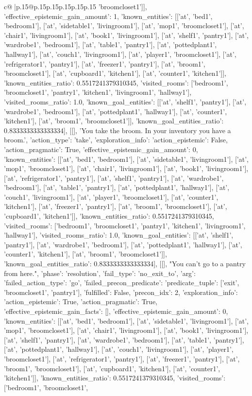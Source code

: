\documentclass{article}
\begin{document}
{\begin{supertabular}{c@{$\;$}|p{.15\linewidth}@{}p{.15\linewidth}p{.15\linewidth}p{.15\linewidth}p{.15\linewidth}p{.15\linewidth}}
{{{'broomcloset1']], 'effective_epistemic_gain_amount': 1, 'known_entities': [['at', 'bed1', 'bedroom1'], ['at', 'sidetable1', 'livingroom1'], ['at', 'mop1', 'broomcloset1'], ['at', 'chair1', 'livingroom1'], ['at', 'book1', 'livingroom1'], ['at', 'shelf1', 'pantry1'], ['at', 'wardrobe1', 'bedroom1'], ['at', 'table1', 'pantry1'], ['at', 'pottedplant1', 'hallway1'], ['at', 'couch1', 'livingroom1'], ['at', 'player1', 'broomcloset1'], ['at', 'refrigerator1', 'pantry1'], ['at', 'freezer1', 'pantry1'], ['at', 'broom1', 'broomcloset1'], ['at', 'cupboard1', 'kitchen1'], ['at', 'counter1', 'kitchen1']], 'known_entities_ratio': 0.5517241379310345, 'visited_rooms': ['bedroom1', 'broomcloset1', 'pantry1', 'kitchen1', 'livingroom1', 'hallway1'], 'visited_rooms_ratio': 1.0, 'known_goal_entities': [['at', 'shelf1', 'pantry1'], ['at', 'wardrobe1', 'bedroom1'], ['at', 'pottedplant1', 'hallway1'], ['at', 'counter1', 'kitchen1'], ['at', 'broom1', 'broomcloset1']], 'known_goal_entities_ratio': 0.8333333333333334}}], [[], 'You take the broom. In your inventory you have a broom.', {'action_type': 'take', 'exploration_info': {'action_epistemic': False, 'action_pragmatic': True, 'effective_epistemic_gain_amount': 0, 'known_entities': [['at', 'bed1', 'bedroom1'], ['at', 'sidetable1', 'livingroom1'], ['at', 'mop1', 'broomcloset1'], ['at', 'chair1', 'livingroom1'], ['at', 'book1', 'livingroom1'], ['at', 'refrigerator1', 'pantry1'], ['at', 'shelf1', 'pantry1'], ['at', 'wardrobe1', 'bedroom1'], ['at', 'table1', 'pantry1'], ['at', 'pottedplant1', 'hallway1'], ['at', 'couch1', 'livingroom1'], ['at', 'player1', 'broomcloset1'], ['at', 'counter1', 'kitchen1'], ['at', 'freezer1', 'pantry1'], ['at', 'broom1', 'broomcloset1'], ['at', 'cupboard1', 'kitchen1']], 'known_entities_ratio': 0.5517241379310345, 'visited_rooms': ['bedroom1', 'broomcloset1', 'pantry1', 'kitchen1', 'livingroom1', 'hallway1'], 'visited_rooms_ratio': 1.0, 'known_goal_entities': [['at', 'shelf1', 'pantry1'], ['at', 'wardrobe1', 'bedroom1'], ['at', 'pottedplant1', 'hallway1'], ['at', 'counter1', 'kitchen1'], ['at', 'broom1', 'broomcloset1']], 'known_goal_entities_ratio': 0.8333333333333334}}], [[], "You can't go to a pantry from here.", {'phase': 'resolution', 'fail_type': 'no_exit_to', 'arg': {'failed_action_type': 'go', 'failed_precon_predicate': {'predicate_tuple': ['exit', 'broomcloset1', 'pantry1'], 'fulfilled': False, 'precon_idx': 2}}, 'exploration_info': {'action_epistemic': True, 'action_pragmatic': True, 'effective_epistemic_gain_facts': [], 'effective_epistemic_gain_amount': 0, 'known_entities': [['at', 'bed1', 'bedroom1'], ['at', 'sidetable1', 'livingroom1'], ['at', 'mop1', 'broomcloset1'], ['at', 'chair1', 'livingroom1'], ['at', 'book1', 'livingroom1'], ['at', 'shelf1', 'pantry1'], ['at', 'wardrobe1', 'bedroom1'], ['at', 'table1', 'pantry1'], ['at', 'pottedplant1', 'hallway1'], ['at', 'couch1', 'livingroom1'], ['at', 'player1', 'broomcloset1'], ['at', 'refrigerator1', 'pantry1'], ['at', 'freezer1', 'pantry1'], ['at', 'broom1', 'broomcloset1'], ['at', 'cupboard1', 'kitchen1'], ['at', 'counter1', 'kitchen1']], 'known_entities_ratio': 0.5517241379310345, 'visited_rooms': ['bedroom1', 'broomcloset1', }}}
\end{supertabular}}
\end{document}

